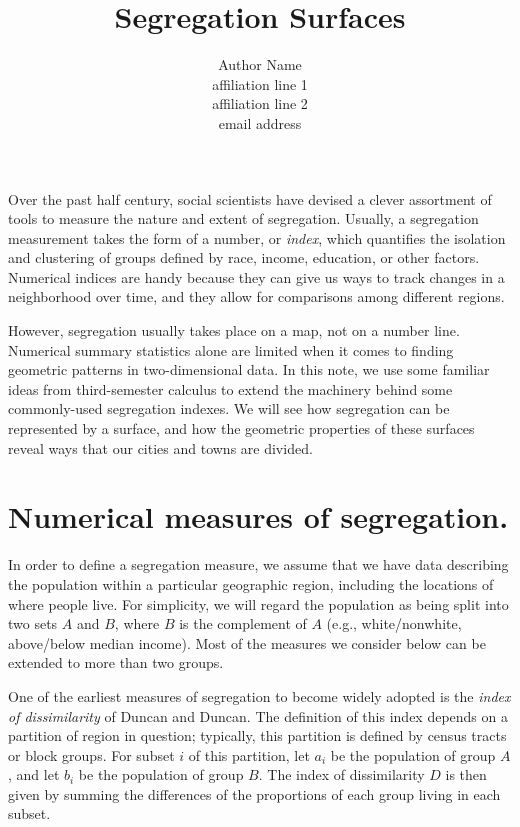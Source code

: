 \documentclass{article}
\theoremstyle{theorem}
\theoremstyle{definition}
\begin{document}
\title{Segregation Surfaces}

\author{Author Name\\               %
\scriptsize affiliation line 1\\    %
affiliation line 2\\                %
email address}                      %

\maketitle

\noindent Over the past half century, social scientists have devised a clever assortment of tools to measure the nature and extent of segregation. \cite{harrisjohnson18} Usually, a segregation measurement takes the form of a number, or \textit{index}, which quantifies the isolation and clustering of groups defined by race, income, education, or other factors. Numerical indices are handy because they can give us ways to track changes in a neighborhood over time, and they allow for comparisons among different regions.

However, segregation usually takes place on a map, not on a number line. Numerical summary statistics alone are limited when it comes to finding geometric patterns in two-dimensional data. In this note, we use some familiar ideas from third-semester calculus to extend the machinery behind some commonly-used segregation indexes. We will see how segregation can be represented by a surface, and how the geometric properties of these surfaces reveal ways that our cities and towns are divided.

\section{Numerical measures of segregation.}

In order to define a segregation measure, we assume that we have data describing the population within a particular geographic region, including the locations of where people live. For simplicity, we will regard the population as being split into two sets $A$ and $B$, where $B$ is the complement of $A$ (e.g., white/nonwhite, above/below median income). Most of the measures we consider below can be extended to more than two groups.

One of the earliest measures of segregation to become widely adopted is the \textit{index of dissimilarity} of Duncan and Duncan. \cite{duncan55} The definition of this index depends on a partition of region in question; typically, this partition is defined by census tracts or block groups. For subset $i$ of this partition, let $a_i$ be the population of group $A$, and let $b_i$ be the population of group $B$. The index of dissimilarity $D$ is then given by summing the differences of the proportions of each group living in each subset.
\end{document}
